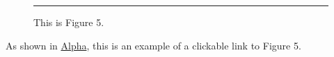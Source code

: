 \documentclass{article}
\begin{document}
\begin{figure}[h]
    \centering
    \rule{10cm}{10cm} %
    \caption{This is Figure 5.}
    \label{fig:figure5}
\end{figure}

As shown in \hyperref[fig:figure5]{Alpha}, this is an example of a clickable link to Figure 5.
\end{document}
